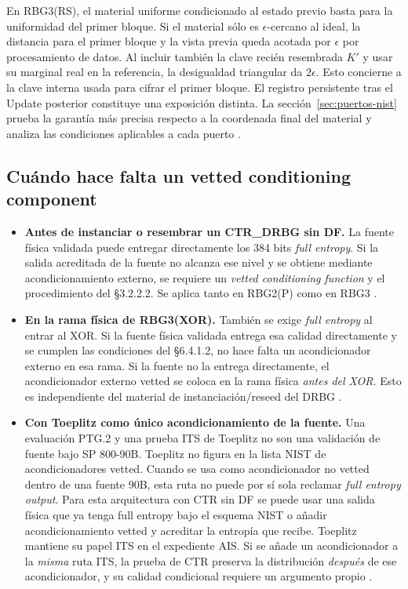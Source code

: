 \documentclass[11pt,a4paper]{article}
\begin{document}
En RBG3(RS), el material uniforme condicionado al estado previo basta para la
uniformidad del primer bloque. Si el material sólo es $\epsilon$-cercano al ideal,
la distancia para el primer bloque y la vista previa queda acotada por $\epsilon$
por procesamiento de datos. Al incluir también la clave recién resembrada $K'$ y
usar su marginal real en la referencia, la desigualdad triangular da
$2\epsilon$. Esto concierne a la clave interna usada para cifrar el primer bloque.
El registro persistente tras el Update posterior constituye una exposición distinta.
La sección~\ref{sec:puertos-nist} prueba la garantía más precisa respecto a la
coordenada final del material y analiza las condiciones aplicables a cada puerto
\cite[§§2.1 y 6.3--6.5]{nist90c}.

\subsection{Cuándo hace falta un vetted conditioning component}
\label{sec:ctr-vetted}

\begin{itemize}
\item \textbf{Antes de instanciar o resembrar un CTR\_DRBG sin DF.}
La fuente física validada puede entregar directamente los 384 bits
\emph{full entropy}. Si la salida acreditada de la fuente no alcanza
ese nivel y se obtiene mediante acondicionamiento externo, se
requiere un \emph{vetted conditioning function} y el procedimiento
del §3.2.2.2. Se aplica tanto en RBG2(P) como en RBG3
\cite[§§3.2, 5.3(7), 6.3(5)]{nist90c}.
\item \textbf{En la rama física de RBG3(XOR).}
También se exige \emph{full entropy} al entrar al XOR. Si la fuente
física validada entrega esa calidad directamente y se cumplen
las condiciones del §6.4.1.2, no hace falta un acondicionador
externo en esa rama. Si la fuente no la entrega directamente,
el acondicionador externo vetted se coloca en la rama física
\emph{antes del XOR}. Esto es independiente del material de
instanciación/reseed del DRBG \cite[§§6.3(7), 6.4--6.4.2]{nist90c}.
\item \textbf{Con Toeplitz como único acondicionamiento de la fuente.}
Una evaluación PTG.2 y una prueba ITS de Toeplitz no son una
validación de fuente bajo SP 800-90B. Toeplitz no figura en la
lista NIST de acondicionadores vetted. Cuando se usa como
acondicionador no vetted dentro de una fuente 90B, esta ruta
no puede por sí sola reclamar \emph{full entropy output}.
Para esta arquitectura con CTR sin DF se puede usar una salida
física que ya tenga full entropy bajo el esquema NIST o añadir
acondicionamiento vetted y acreditar la entropía que recibe.
Toeplitz mantiene su papel ITS en el expediente AIS. Si se
añade un acondicionador a la \emph{misma} ruta ITS, la prueba
de CTR preserva la distribución \emph{después} de ese
acondicionador, y su calidad condicional requiere un argumento
propio \cite[§3.1.5]{nist90b}\cite{nist-vetted}\cite[§3.2]{nist90c}.
\end{itemize}
\end{document}
